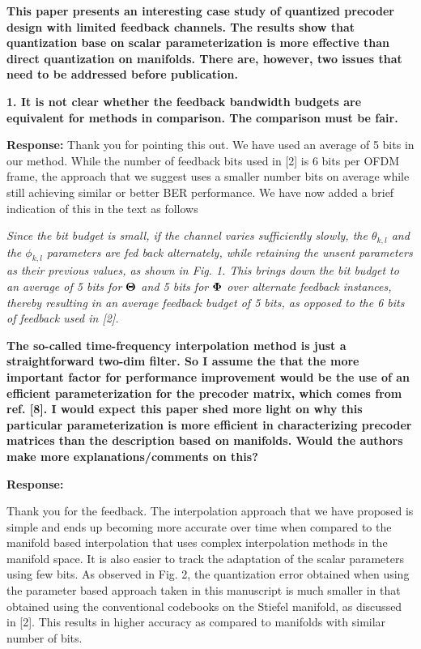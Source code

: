 \documentclass[12pt]{letter}
\begin{document}
\textbf{This paper presents an interesting case study of quantized
  precoder design with limited feedback channels. The results show
  that quantization base on scalar parameterization is more effective
  than direct quantization on manifolds. There are, however, two
  issues that need to be addressed before publication.}

\textbf{1. It is not clear whether the feedback bandwidth budgets are
equivalent for methods in comparison. The comparison must be fair.}

\textbf{Response:} Thank you for pointing this out. We have used an
average of 5 bits in our method. While the number of feedback bits
used in [2] is 6 bits per OFDM frame, the approach that we suggest
uses a smaller number bits on average while still achieving similar or
better BER performance. We have now added a brief indication of this
in the text as follows

\emph{Since the bit budget is small, if the channel varies
sufficiently slowly, the $\theta_{k,l}$ and the $\phi_{k,l}$ parameters
are fed back alternately, while retaining the unsent parameters as
their previous values, as shown in
Fig. 1. This brings down the bit budget to an average of 5 bits for
$\bf{\Theta}$ and 5 bits for $\bf{\Phi}$ over alternate feedback
instances, thereby resulting in an average feedback budget of 5 bits,
as opposed to the 6 bits of feedback used
in [2].}

\textbf{ The so-called time-frequency interpolation method is just a
  straightforward two-dim filter. So I assume the that the more
  important factor for performance improvement would be the use of an
  efficient parameterization for the precoder matrix, which comes from
  ref. [8]. I would expect this paper shed more light on why this
  particular parameterization is more efficient in characterizing
  precoder matrices than the description based on manifolds.  Would
  the authors make more explanations/comments on this?}

\textbf{Response:}

Thank you for the feedback. The interpolation approach that we have
proposed is simple and ends up becoming more accurate over time when
compared to the manifold based interpolation that uses complex
interpolation methods in the manifold space. It is also easier to
track the adaptation of the scalar parameters using few bits. As
observed in Fig. 2, the quantization error obtained when using the
parameter based approach taken in this manuscript is much smaller in
that obtained using the conventional codebooks on the Stiefel
manifold, as discussed in [2]. This results in higher accuracy as
compared to manifolds with similar number of bits.
\end{document}
